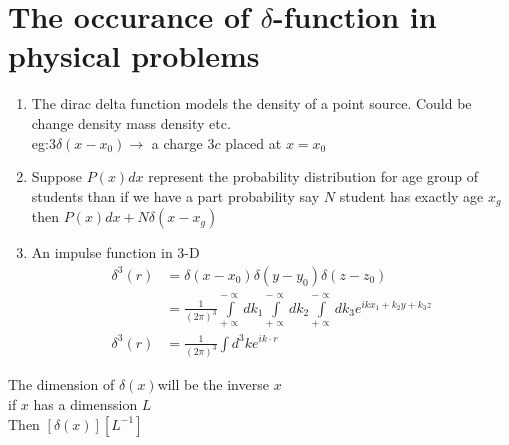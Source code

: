 \section{The occurance of $\delta$-function in physical problems}
\begin{enumerate}
	\item The dirac delta function models the density of a point source. Could be change density mass density etc.\\
	eg:3$\delta(x-x_0)$$\rightarrow$ a charge $3c$ placed at $x=x_0$
	\item Suppose $P(x)dx$ represent the probability distribution for age group of students than if we have a part probability say $N$ student has exactly age $x_g$ then $P(x)dx+N\delta(x-x_g)$
	\item An impulse function in 3-D\\
	\begin{align*}
	\delta^3(r)&=\delta(x-x_0)\delta(y-y_0)\delta(z-z_0)\\
	&=\frac{1}{(2\pi)^3}\int\limits_{+\propto}^{-\propto}dk_1\int\limits_{+\propto}^{-\propto}dk_2\int\limits_{+\propto}^{-\propto}dk_3 e^{ikx_1+k_2y+k_3z}\\
	\delta^3(r)&=\frac{1}{(2\pi)^3}\int d^3ke^{ik\cdot r}
	\end{align*}
\end{enumerate}
The dimension of $\delta(x)$will be the inverse $x$ \\
if $x$ has a dimenssion $L$\\
Then $ \left[ \delta(x)\right]\left[ L^{-1}\right]  $
